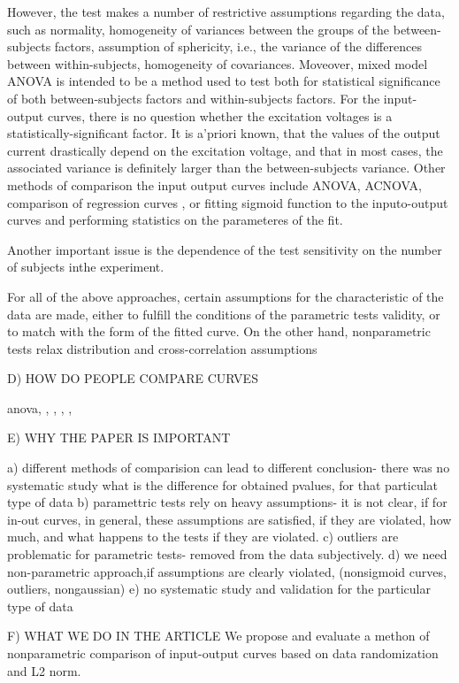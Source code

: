 \documentclass[fleqn,10pt]{wlscirep}
\begin{document}
However, the test makes a number of restrictive assumptions regarding the data, such as normality, homogeneity of variances between the groups of the between-subjects factors, assumption of sphericity, i.e.,  the variance of the differences between within-subjects, homogeneity of covariances. Moveover, mixed model ANOVA is intended to be a method used to test both for statistical significance of both between-subjects factors and within-subjects factors. For the input-output curves, there is no question whether the excitation voltages is a statistically-significant factor. It is a'priori known, that the values of the output current drastically depend on the excitation voltage, and that in most cases, the associated variance is definitely larger than the between-subjects variance.
Other methods of comparison the input output curves include ANOVA, ACNOVA, comparison of regression curves \cite{Neumeyer}, or fitting sigmoid function to the inputo-output curves and performing statistics on the parameteres of the fit. 

Another important issue is the dependence of the test sensitivity on the number of subjects inthe experiment.

For all of the above approaches, certain assumptions for the characteristic of the data are made, either to fulfill the conditions of the parametric tests validity, or to match with the form of the fitted curve. On the other hand, nonparametric tests relax distribution and cross-correlation assumptions \cite{krzywinski}

D) HOW DO PEOPLE COMPARE CURVES

anova\cite{sunggu}, \cite{maciver}, \cite{zaitsev}, \cite{inestrosa}, \cite{rosahl},  \cite{weeber}


E) WHY THE PAPER IS IMPORTANT

a) different methods of comparision can lead to different conclusion- there was no systematic study what is the difference for obtained pvalues, for that particulat type of data
b) paramettric tests rely on heavy assumptions- it is not clear, if for in-out curves, in general, these assumptions are satisfied, if they are violated, how much, and what happens to the tests if they are violated.
c) outliers are problematic for parametric tests- removed from the data subjectively.
d) we need non-parametric approach,if assumptions are clearly violated, (nonsigmoid curves, outliers, nongaussian)
e) no systematic study and validation for the particular type of data

F) WHAT WE DO IN THE ARTICLE
We propose and evaluate a methon of nonparametric comparison of input-output curves based on data randomization and L2 norm. 
\end{document}
